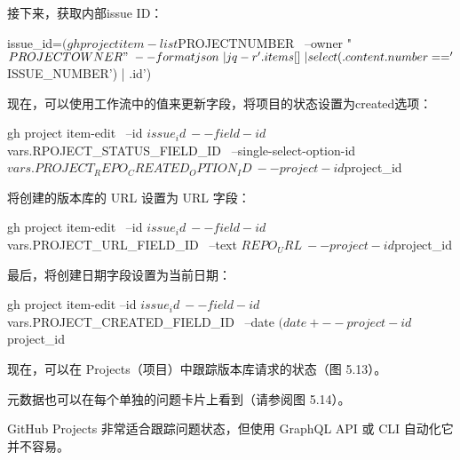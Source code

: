 接下来，获取内部issue ID：

\begin{shell}
issue_id=$(gh project item-list $PROJECTNUMBER \
  --owner "$PROJECTOWNER" \
  --format json \
  | jq -r '.items[] \
  | select(.content.number=='$ISSUE_NUMBER') | .id')
\end{shell}

现在，可以使用工作流中的值来更新字段，将项目的状态设置为created选项：

\begin{shell}
gh project item-edit \
  --id $issue_id \
  --field-id ${{ vars.RPOJECT_STATUS_FIELD_ID }} \
  --single-select-option-id ${{ vars.PROJECT_REPO_CREATED_OPTION_ID }} \
  --project-id $project_id
\end{shell}

将创建的版本库的 URL 设置为 URL 字段：

\begin{shell}
gh project item-edit \
  --id $issue_id \
  --field-id ${{ vars.PROJECT_URL_FIELD_ID }} \
  --text $REPO_URL \
  --project-id $project_id
\end{shell}

最后，将创建日期字段设置为当前日期：

\begin{shell}
gh project item-edit --id $issue_id \
  --field-id ${{ vars.PROJECT_CREATED_FIELD_ID }} \
  --date $(date +%
  --project-id $project_id
\end{shell}

现在，可以在 Projects（项目）中跟踪版本库请求的状态（图 5.13）。


元数据也可以在每个单独的问题卡片上看到（请参阅图 5.14）。


GitHub Projects 非常适合跟踪问题状态，但使用 GraphQL API 或 CLI 自动化它并不容易。































